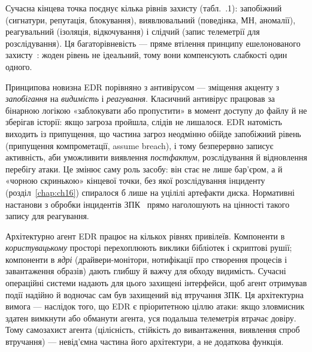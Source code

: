 \begin{tikzfig}
\end{tikzfig}

Сучасна кінцева точка поєднує кілька рівнів захисту (табл.~\thechapter.1): запобіжний (сигнатури, репутація, блокування), виявлювальний (поведінка, МН, аномалії), реагувальний (ізоляція, відкочування) і слідчий (запис телеметрії для розслідування). Ця багаторівневість --- пряме втілення принципу ешелонованого захисту~\cite{ch10:defense-depth}: жоден рівень не ідеальний, тому вони компенсують слабкості один одного.

Принципова новизна EDR порівняно з антивірусом --- зміщення акценту з \emph{запобігання} на \emph{видимість} і \emph{реагування}. Класичний антивірус працював за бінарною логікою «заблокувати або пропустити» в момент доступу до файлу й не зберігав історії: якщо загроза пройшла, слідів не лишалося. EDR натомість виходить із припущення, що частина загроз неодмінно обійде запобіжний рівень (припущення компрометації, assume breach), і тому безперервно записує активність, аби уможливити виявлення \emph{постфактум}, розслідування й відновлення перебігу атаки. Це змінює саму роль засобу: він стає не лише бар'єром, а й «чорною скринькою» кінцевої точки, без якої розслідування інциденту (розділ~\ref{chap:ch16}) спиралося б лише на уцілілі артефакти диска. Нормативні настанови з обробки інцидентів ЗПК~\cite{nist-83} прямо наголошують на цінності такого запису для реагування.

Архітектурно агент EDR працює на кількох рівнях привілеїв. Компоненти в \emph{користувацькому} просторі перехоплюють виклики бібліотек і скриптові рушії; компоненти в \emph{ядрі} (драйвери-монітори, нотифікації про створення процесів і завантаження образів) дають глибшу й важчу для обходу видимість. Сучасні операційні системи надають для цього захищені інтерфейси, щоб агент отримував події надійно й водночас сам був захищений від втручання ЗПК. Ця архітектурна вимога --- наслідок того, що EDR є пріоритетною ціллю атаки: якщо зловмисник здатен вимкнути або обманути агента, уся подальша телеметрія втрачає довіру. Тому самозахист агента (цілісність, стійкість до вивантаження, виявлення спроб втручання) --- невід'ємна частина його архітектури, а не додаткова функція.

